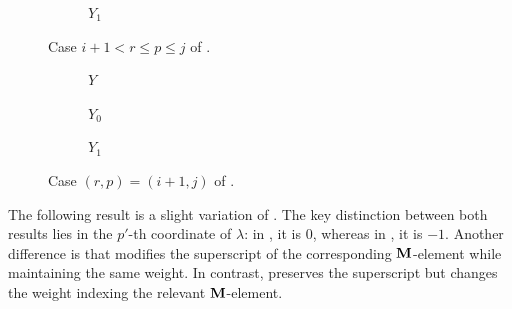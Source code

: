 \begin{example}
\begin{figure}[H]
\begin{subfigure}[b]{0.22\textwidth}
    \caption{ $Y_{1} $}
    \label{fig: ExaLemma3.7C1}
     \end{subfigure}
        \caption{Case $i+1 < r\leq p\leq j$ of .}
        \label{fig: EJEMPLO Lemma 3.7 1}
\end{figure}
 \begin{figure}[H]
     \centering
     \begin{subfigure}[b]{0.22\textwidth}
         \centering
        {}
    \caption{ $Y$  }
    \label{fig: ExaLemma3.7A2}
     \end{subfigure}
     \begin{subfigure}[b]{0.22\textwidth}
         \centering
        {}
    \caption{$Y_{0} $}
    \label{fig: ExaLemma3.7B2}
     \end{subfigure}
     \begin{subfigure}[b]{0.22\textwidth}
         \centering
        {}
    \caption{ $Y_{1} $}
    \label{fig: ExaLemma3.7C2}
     \end{subfigure}
        \caption{Case $(r,p) = (i+1,j)$ of .}
        \label{fig: EJEMPLO Lemma 3.7 2}
\end{figure}   
\end{example}

The following result is a slight variation of .
The key distinction between both results lies in the $p'$-th coordinate of $\lambda$: in , it is $0$, whereas in , it is $-1$.
Another difference is that  modifies the superscript of the corresponding $\mathbf{M}$-element while maintaining the same weight.
In contrast,  preserves the superscript but changes the weight indexing the relevant $\mathbf{M}$-element.



